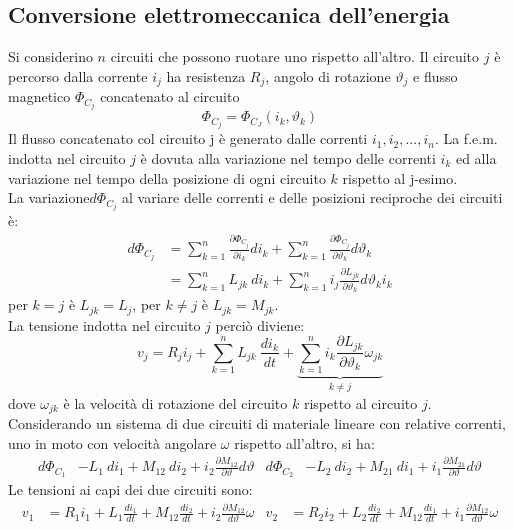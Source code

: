 \documentclass{article}
\begin{document}
\subsection{Conversione elettromeccanica dell'energia}
Si considerino $n$ circuiti che possono ruotare
uno rispetto all'altro. Il circuito $j$ è percorso
dalla corrente $i_j$ ha resistenza $R_j$, angolo di rotazione $\vartheta_j$ e flusso magnetico $\Phi_{C_j}$ concatenato al circuito
\[\Phi_{C_j} = \Phi_{C_J}(i_k,\vartheta_k)\]
Il flusso concatenato col circuito j è generato
dalle correnti $i_1, i_2,..., i_n$. La f.e.m. indotta nel circuito $j$ è dovuta alla variazione nel tempo delle correnti $i_k$ ed alla variazione nel tempo della posizione di ogni circuito $k$
rispetto al j-esimo.\\
La variazione$d \Phi_{C_j}$ al variare delle correnti e delle posizioni reciproche dei circuiti è:
\begin{align*}
    d \Phi_{C_j} &= \sum_{k=1}^n \frac{\partial \Phi_{C_j}}{\partial i_k}d i_k + \sum_{k=1}^n \frac{\partial \Phi_{C_j}}{\partial \vartheta_k}d \vartheta_k
    \\
    &= \sum_{k=1}^n L_{jk} \ d i_k + \sum_{k=1}^n i_j \frac{\partial L_{jk}}{\partial \vartheta_k} d \vartheta_k i_k
\end{align*}
per $k=j$ è $L_{jk}=L_j$, per $k \neq j$ è $L_{jk} = M_{jk}$.\\
La tensione indotta nel circuito $j$ perciò diviene:
\[v_j = R_ji_j + \sum_{k=1}^n L_{jk} \ \frac{d i_k}{dt} +\underbrace{ \sum_{k=1}^n  i_k\frac{\partial L_{jk}}{\partial \vartheta_k} \omega_{jk}}_{k \neq j}\]
dove $\omega_{jk}$ è la velocità di rotazione del circuito $k$ rispetto al circuito $j$.
\vspace*{0.2cm}\\
Considerando un sistema di due circuiti di materiale lineare con relative correnti, uno in moto con velocità angolare $\omega$ rispetto all'altro, si ha:
\begin{align*}
    d \Phi_{C_1} &- L_1 \ di_1 + M_{12}\ di_2 + i_2 \frac{\partial M_{12}}{\partial \vartheta} d \vartheta
    &
    d \Phi_{C_2} &- L_2 \ di_2 + M_{21} \ di_1 + i_1 \frac{\partial M_{21}}{\partial \vartheta} d \vartheta
\end{align*}
Le tensioni ai capi dei due circuiti sono:
\begin{align*}
    v_1 &= R_1i_1 + L_1 \frac{di_1}{dt} + M_{12} \frac{di_2}{dt} + i_2 \frac{\partial M_{12}}{d\vartheta} \omega
    &
    v_2 &= R_2i_2 + L_2 \frac{di_2}{dt} + M_{12} \frac{di_1}{dt} + i_1 \frac{\partial M_{12}}{d\vartheta} \omega
\end{align*}
\end{document}

